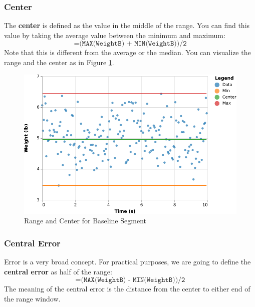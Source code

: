 \subsubsection{Center}
The \textbf{center} is defined as the value in the middle of the range. You can find this value by taking the average value between the minimum and maximum:
\begin{equation}
    \texttt{=(MAX(WeightB) + MIN(WeightB))/2}
\end{equation}
Note that this is different from the average or the median. You can visualize the range and the center as in Figure \ref{figure:00.baseline.center}.
\begin{figure}
    \centering
    \includegraphics{chart/00-intro/baseline-min-center-max.pdf}
    \caption{Range and Center for Baseline Segment}
    \label{figure:00.baseline.center}
\end{figure}
\subsubsection{Central Error}
Error is a very broad concept. For practical purposes, we are going to define the \textbf{central error} as half of the range:
\begin{equation}
    \texttt{=(MAX(WeightB) - MIN(WeightB))/2}
\end{equation}
The meaning of the central error is the distance from the center to either end of the range window.

